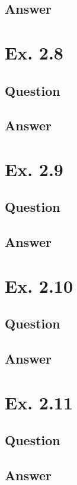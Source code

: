 \documentclass[12pt]{article}
\begin{document}
\subsection*{Answer}

\newpage
\section*{Ex. 2.8}
\subsection*{Question}

\subsection*{Answer}

\newpage
\section*{Ex. 2.9}
\subsection*{Question}

\subsection*{Answer}

\newpage
\section*{Ex. 2.10}
\subsection*{Question}

\subsection*{Answer}

\newpage
\section*{Ex. 2.11}
\subsection*{Question}

\subsection*{Answer}
\end{document}
